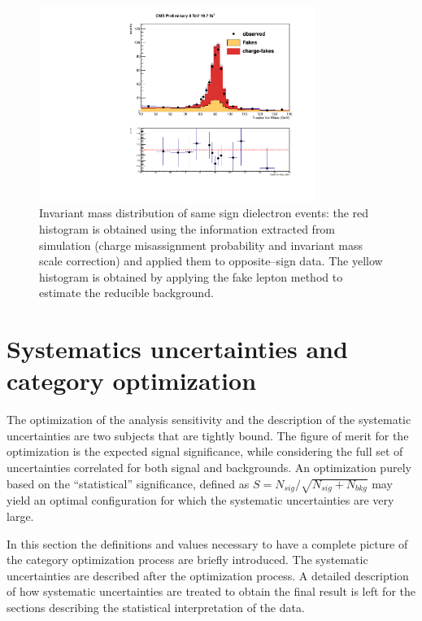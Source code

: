 \begin{figure}
  \begin{center}
  \includegraphics[width=0.8\textwidth]{4_Analisys/pics/8TeV/plots/zee/EE_Charge_Flip_xcheck_trk_invMass.pdf}
  \caption{Invariant mass distribution of same sign dielectron events: the red histogram is obtained using the information extracted from simulation
(charge misassignment probability and invariant mass scale correction) and applied them to opposite--sign data. The yellow histogram is obtained by applying the fake lepton method to estimate the reducible background.}
  \label{fig:control_Zee}
  \end{center}
\end{figure}

\section{Systematics uncertainties and category optimization}
\label{sec:systematics}

The optimization of the analysis sensitivity and the description of the systematic uncertainties are two subjects that are tightly bound. The figure of merit for %
the optimization is the expected signal significance, while considering the full set of uncertainties correlated for both signal and backgrounds. An optimization purely based on the ``statistical'' significance, defined as $S = N_{sig} / \sqrt{N_{sig} + N_{bkg}}$ may yield an optimal configuration for which the systematic uncertainties are very large.

In this section the definitions and values necessary to have a complete picture of the category optimization process are briefly introduced. The systematic uncertainties are described after the optimization process.
A detailed description of how systematic uncertainties are treated to obtain the final result is left for the sections describing the statistical interpretation of the data.

